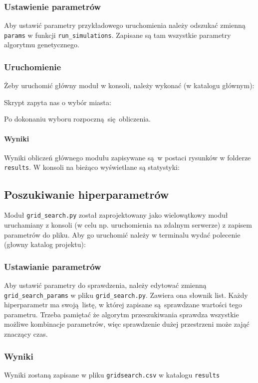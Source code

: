 \documentclass[12pt,a4paper]{article}
\begin{document}
\subsubsection{Ustawienie parametrów}
Aby ustawić parametry przykładowego uruchomienia należy odszukać zmienną \lstinline|params| w funkcji \lstinline|run_simulations|. Zapisane są tam wszystkie parametry algorytmu genetycznego.

\subsubsection{Uruchomienie}
Żeby uruchomić główny moduł w konsoli, należy wykonać (w katalogu głównym):


Skrypt zapyta nas o wybór miasta:

Po dokonaniu wyboru rozpoczną się obliczenia.

\paragraph{Wyniki}
Wyniki obliczeń głównego modułu zapisywane są w postaci rysunków w folderze \lstinline|results|. W konsoli na bieżąco wyświetlane są statystyki:


\subsection{Poszukiwanie hiperparametrów}
Moduł \lstinline|grid_search.py| został zaprojektowany jako wielowątkowy moduł uruchamiany z konsoli (w celu np. uruchomienia na zdalnym serwerze) z zapisem parametrów do pliku. Aby go uruchomić należy w terminalu wydać polecenie (głowny katalog projektu):


\subsubsection{Ustawianie parametrów}
Aby ustawić parametry do sprawdzenia, należy edytować zmienną \lstinline|grid_search_params| w pliku \lstinline|grid_search.py|. Zawiera ona słownik list. Każdy hiperparametr ma swoją listę, w której zapisane są sprawdzane wartości tego parametru. Trzeba pamiętać że algorytm przeszukiwania sprawdza wszystkie możliwe kombinacje parametrów, więc sprawdzenie dużej przestrzeni może zająć znaczący czas.

\subsubsection{Wyniki}
Wyniki zostaną zapisane w pliku \lstinline|gridsearch.csv| w katalogu \lstinline|results|
\end{document}
